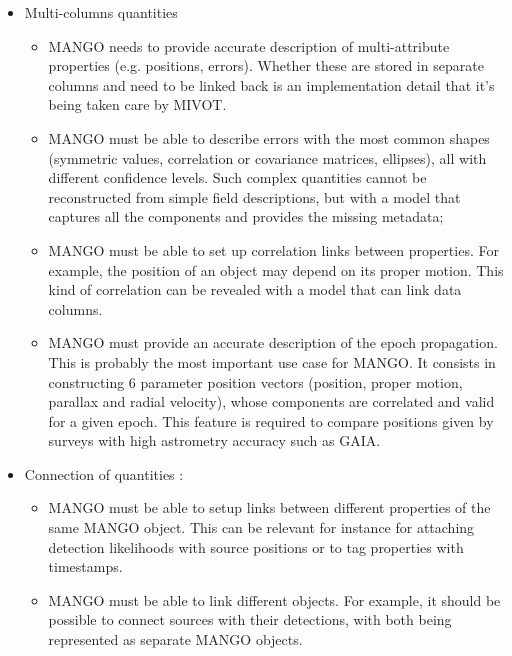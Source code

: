 \documentclass[11pt,a4paper]{ivoa}
\begin{document}
\begin{itemize}
    \item Multi-columns quantities
       \begin{itemize}[noitemsep,topsep=0pt,parsep=0pt,partopsep=0pt]
          \item	MANGO needs to provide accurate description of multi-attribute properties (e.g. positions, errors).
				Whether these are stored in separate columns and need to be linked back is an implementation detail
				that it’s being taken care by MIVOT. 
          \item MANGO must be able to describe errors with the most common shapes (symmetric values, correlation 
                or covariance matrices, ellipses), all with different confidence levels. 
                Such complex quantities cannot be reconstructed from simple field descriptions, but with a model
                that captures all the components and provides the missing metadata;
          \item MANGO must be able to set up correlation links between properties. For example,
                the position of an object may depend on its proper motion. This kind of correlation can be revealed 
                with a model that can link data columns.
          \item MANGO must provide an accurate description of the epoch propagation. 
                This is probably the most important use case for MANGO. It consists in constructing 6 parameter 
                position vectors (position, proper motion, parallax and radial velocity), whose components are 			
                correlated and valid for a given epoch. 
                This feature is required to compare positions given by surveys with high astrometry accuracy such as GAIA.
       \end{itemize} 
         
    \item Connection of quantities : 
       \begin{itemize}[noitemsep,topsep=0pt,parsep=0pt,partopsep=0pt]
           \item MANGO must be able to setup links between different properties of the same MANGO object. 
                 This can be relevant for instance for attaching detection likelihoods with source positions
                 or to tag properties with timestamps.
           \item MANGO must be able to link different objects. For example,
		         it should be possible to connect sources with their detections,
				 with both being represented as separate MANGO objects.
        \end{itemize}   
\end{itemize}
\end{document}
